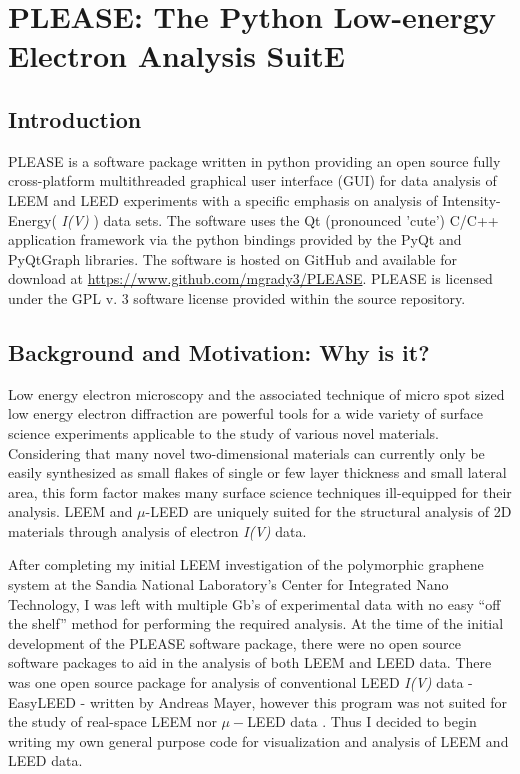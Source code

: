 \chapter{\sc PLEASE: The \textbf{P}ython \textbf{L}ow-energy \textbf{E}lectron \textbf{A}nalysis \textbf{S}uit\textbf{E}}
\newcommand{\shellcmd}[1]{\\\indent\indent\texttt{\footnotesize\# #1}\\}
\label{app:Appendix A PLEASE: Python Low-energy Electron Analysis SuitE}


\section{Introduction}
PLEASE is a software package written in python providing an open source fully cross-platform multithreaded graphical user interface (GUI) for data analysis of LEEM and LEED experiments with a specific emphasis on analysis of Intensity-Energy( \textit{I(V)} ) data sets. The software uses the Qt (pronounced 'cute') C/C++ application framework via the python bindings provided by the PyQt and PyQtGraph libraries. The software is hosted on GitHub and available for download at \url{https://www.github.com/mgrady3/PLEASE}. PLEASE is licensed under the GPL v. 3 software license provided within the source repository.

\section{Background and Motivation: Why is it?}
 Low energy electron microscopy and the associated technique of micro spot sized low energy electron diffraction are powerful tools for a wide variety of surface science experiments applicable to the study of various novel materials. Considering that many novel two-dimensional materials can currently only be easily synthesized as small flakes of single or few layer thickness and small lateral area, this form factor makes many surface science techniques ill-equipped for their analysis. LEEM and $\mu$-LEED are uniquely suited for the structural analysis of 2D materials through analysis of electron \textit{I(V)} data.

 After completing my initial LEEM investigation of the polymorphic graphene system at the Sandia National Laboratory's Center for Integrated Nano Technology, I was left with multiple Gb's of experimental data with no easy ``off the shelf'' method for performing the required analysis. At the time of the initial development of the PLEASE software package, there were no open source software packages to aid in the analysis of both LEEM and LEED data. There was one open source package for analysis of conventional LEED \textit{I(V)} data - EasyLEED - written by Andreas Mayer, however this program was not suited for the study of real-space LEEM nor $\mu-$LEED data \cite{easy-leed}. Thus I decided to begin writing my own general purpose code for visualization and analysis of LEEM and LEED data.

